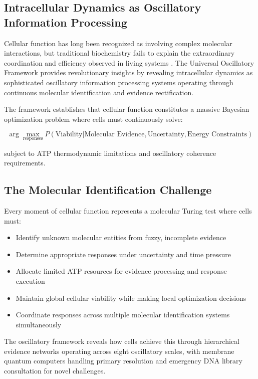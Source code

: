 \documentclass[12pt,a4paper]{article}
\begin{document}
\subsection{Intracellular Dynamics as Oscillatory Information Processing}

Cellular function has long been recognized as involving complex molecular interactions, but traditional biochemistry fails to explain the extraordinary coordination and efficiency observed in living systems \cite{alberts2014molecular}. The Universal Oscillatory Framework \cite{sachikonye2024mathematical,sachikonye2024physical} provides revolutionary insights by revealing intracellular dynamics as sophisticated oscillatory information processing systems operating through continuous molecular identification and evidence rectification.

The framework establishes that cellular function constitutes a massive Bayesian optimization problem where cells must continuously solve:

\begin{equation}
\arg\max_{\text{responses}} P(\text{Viability} | \text{Molecular Evidence}, \text{Uncertainty}, \text{Energy Constraints})
\end{equation}

subject to ATP thermodynamic limitations and oscillatory coherence requirements.

\subsection{The Molecular Identification Challenge}

Every moment of cellular function represents a molecular Turing test where cells must:

\begin{itemize}
\item Identify unknown molecular entities from fuzzy, incomplete evidence
\item Determine appropriate responses under uncertainty and time pressure
\item Allocate limited ATP resources for evidence processing and response execution
\item Maintain global cellular viability while making local optimization decisions
\item Coordinate responses across multiple molecular identification systems simultaneously
\end{itemize}

The oscillatory framework reveals how cells achieve this through hierarchical evidence networks operating across eight oscillatory scales, with membrane quantum computers handling primary resolution and emergency DNA library consultation for novel challenges.
\end{document}

